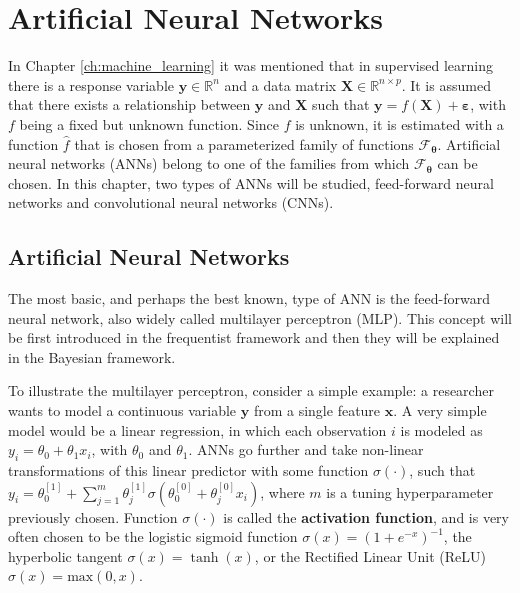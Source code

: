 
\chapter{Artificial Neural Networks}
\label{ch:ann}


In Chapter \ref{ch:machine_learning} it was mentioned that in supervised learning there is a response variable $\boldsymbol{y} \in \mathbb{R}^n$ and a data matrix $\boldsymbol{X} \in \mathbb{R}^{n \times p}$. It is assumed that there exists a relationship between $\boldsymbol{y}$ and $\boldsymbol{X}$ such that
$\boldsymbol{y} = f(\boldsymbol{X}) + \boldsymbol{\varepsilon}$,
with $f$ being a fixed but unknown function. Since $f$ is unknown, it is estimated with a function $\hat{f}$ that is chosen from a parameterized family of functions $\mathcal{F}_{\boldsymbol{\theta}}$. Artificial neural networks (ANNs) belong to one of the families from which $\mathcal{F}_{\boldsymbol{\theta}}$ can be chosen. In this chapter, two types of ANNs will be studied, feed-forward neural networks and convolutional neural networks (CNNs).

\section{Artificial Neural Networks}

The most basic, and perhaps the best known, type of ANN is the feed-forward neural network, also widely called multilayer perceptron (MLP). This concept will be first introduced in the frequentist framework and then they will be explained in the Bayesian framework.

To illustrate the multilayer perceptron, consider a simple example: a researcher wants to model a continuous variable $\boldsymbol{y}$ from a single feature $\boldsymbol{x}$. A very simple model would be a linear regression, in which each observation $i$ is modeled as $y_i = \theta_0 + \theta_1 x_i$, with $\theta_0$ and $\theta_1$. ANNs go further and take non-linear transformations of this linear predictor with some function $\sigma(\cdot)$,
such that $y_i = \theta_0^{[1]} +  \sum_{j = 1}^m \theta_j^{[1]} \sigma \left( \theta_0^{[0]} + \theta_j^{[0]} x_i \right)$,
where $m$ is a tuning hyperparameter previously chosen.
Function $\sigma(\cdot)$ is called the \textbf{activation function}, and is very often chosen to be the logistic sigmoid function $\sigma(x) = (1 + e^{-x})^{-1}$,
the hyperbolic tangent $\sigma(x) = \tanh(x)$,
or the Rectified Linear Unit (ReLU) $\sigma(x) = \mathrm{max}(0, x)$.


